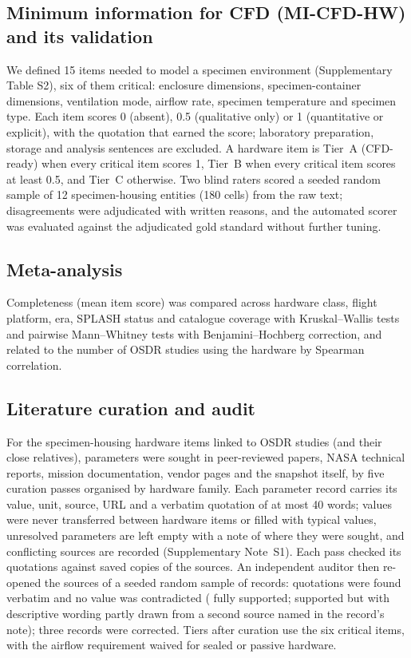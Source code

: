 \documentclass[11pt]{article}
\begin{document}
\subsection{Minimum information for CFD (MI-CFD-HW) and its validation}
We defined 15 items needed to model a specimen environment (Supplementary Table S2), six of them
critical: enclosure dimensions, specimen-container dimensions, ventilation mode, airflow rate, specimen
temperature and specimen type. Each item scores 0 (absent), 0.5 (qualitative only) or 1 (quantitative or
explicit), with the quotation that earned the score; laboratory preparation, storage and analysis
sentences are excluded. A hardware item is Tier~A (CFD-ready) when every critical item scores 1, Tier~B
when every critical item scores at least 0.5, and Tier~C otherwise. Two blind raters scored a seeded
random sample of 12 specimen-housing entities (180 cells) from the raw text; disagreements were
adjudicated with written reasons, and the automated scorer was evaluated against the adjudicated gold
standard without further tuning.

\subsection{Meta-analysis}
Completeness (mean item score) was compared across hardware class, flight platform, era, SPLASH status
and catalogue coverage with Kruskal--Wallis tests and pairwise Mann--Whitney tests with
Benjamini--Hochberg correction, and related to the number of OSDR studies using the hardware by
Spearman correlation.

\subsection{Literature curation and audit}
For the \hwNCurated{} specimen-housing hardware items linked to OSDR studies (and their close
relatives), parameters were sought in peer-reviewed papers, NASA technical reports, mission
documentation, vendor pages and the snapshot itself, by five curation passes organised by hardware family.
Each parameter record carries its value, unit, source, URL and a verbatim quotation of at most 40 words;
values were never transferred between hardware items or filled with typical values, unresolved
parameters are left empty with a note of where they were sought, and conflicting sources are recorded
(Supplementary Note~S1). Each pass checked its quotations against saved copies of the sources. An
independent auditor then re-opened the sources of a seeded random sample of \hwNAudit{} records:
\hwNAuditQuoteFound{} quotations were found verbatim and no value was contradicted
(\hwNAuditValueYes{} fully supported; \hwNAuditValuePartial{} supported but with descriptive wording
partly drawn from a second source named in the record's note); three records were corrected.
Tiers after curation use the six critical items, with the airflow requirement waived for sealed or
passive hardware.
\end{document}
